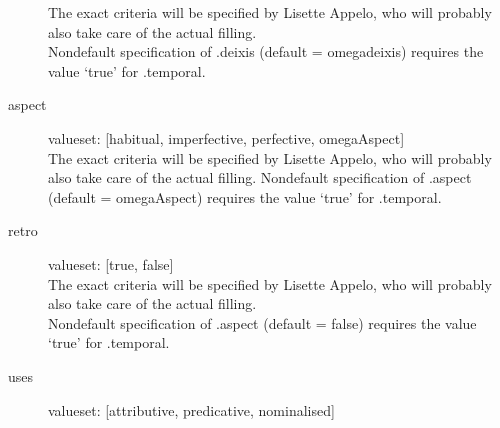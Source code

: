 \begin{description}
The exact criteria will be specified by Lisette Appelo, who will probably also
take care of the actual filling. \\
Nondefault specification of .deixis (default = omegadeixis) requires
the value `true' for .temporal.

\newpage
\item 
[aspect]\mbox{}

valueset: [habitual, imperfective, perfective, omegaAspect]\\


The exact criteria will be specified by Lisette Appelo, who will probably also
take care of the actual filling. 
Nondefault specification of .aspect 
(default = omegaAspect) requires the value `true' for .temporal.

\newpage
\item 
[retro]\mbox{}

valueset: [true, false]\\


The exact criteria will be specified by Lisette Appelo, who will probably also
take care of the actual filling. \\

Nondefault specification of .aspect 
(default = false) requires the value `true' for .temporal.

\newpage
\item [uses]\mbox{}

valueset: [attributive, predicative, nominalised] \\


\end{description}
